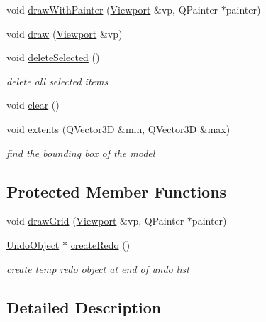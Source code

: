 \begin{DoxyCompactItemize}
\item 
void \hyperlink{classShipCAD_1_1ShipCADModel_aa7d2417dcc847ccf0f72d57eb333410e}{draw\+With\+Painter} (\hyperlink{classShipCAD_1_1Viewport}{Viewport} \&vp, Q\+Painter $\ast$painter)
\item 
void \hyperlink{classShipCAD_1_1ShipCADModel_abf593b803e96a1fd8e56f36b3b6d0954}{draw} (\hyperlink{classShipCAD_1_1Viewport}{Viewport} \&vp)
\item 
void \hyperlink{classShipCAD_1_1ShipCADModel_a83dbf01267c7736a8676336785178db6}{delete\+Selected} ()
\begin{DoxyCompactList}\small\item\em delete all selected items \end{DoxyCompactList}\item 
void \hyperlink{classShipCAD_1_1ShipCADModel_ad2f9dfd32667e9ac690de184b7e576f1}{clear} ()
\item 
void \hyperlink{classShipCAD_1_1ShipCADModel_a7ab84a738b747c4fcb2c3627e56d4bd0}{extents} (Q\+Vector3D \&min, Q\+Vector3D \&max)
\begin{DoxyCompactList}\small\item\em find the bounding box of the model \end{DoxyCompactList}\end{DoxyCompactItemize}
\subsection*{Protected Member Functions}
\begin{DoxyCompactItemize}
\item 
void \hyperlink{classShipCAD_1_1ShipCADModel_af719e24c12a21220c105fc7510d7b8ad}{draw\+Grid} (\hyperlink{classShipCAD_1_1Viewport}{Viewport} \&vp, Q\+Painter $\ast$painter)
\item 
\hyperlink{classShipCAD_1_1UndoObject}{Undo\+Object} $\ast$ \hyperlink{classShipCAD_1_1ShipCADModel_aa8079da42c7e5ab56ff60af82432d29d}{create\+Redo} ()
\begin{DoxyCompactList}\small\item\em create temp redo object at end of undo list \end{DoxyCompactList}\end{DoxyCompactItemize}


\subsection{Detailed Description}


